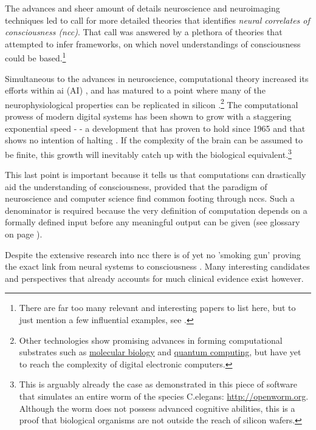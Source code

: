 \documentclass[a4paper,oneside]{memoir}
\begin{document}
The advances and sheer amount of details neuroscience and neuroimaging
techniques led \textcite{atkinson2000} to call for more detailed theories
that identifies \textit{neural correlates of consciousness (\gls{ncc})}.
That call was answered by a plethora of theories
that attempted to infer frameworks, on which novel understandings of
consciousness could be based.\footnote{There are far too many relevant
and interesting papers to list here, but to just mention a few influential examples,
see \cite{baars2005, block2007, crick2003, damasio2003, dehaene2001, graziano2013, kouider2010, Tononi2004, zeki2008, schmidhuber2014, Nilsson2009}.
}

Simultaneous to the advances in neuroscience, \gls{computation}al theory
increased its efforts within \gls{ai} (AI) \autocite{Nilsson2009}, and has
matured to a point where many of the neurophysiological properties can be
replicated in silicon \autocite{Tononi2004, schmidhuber2014, walter2015}.\footnote{Other
technologies show promising advances in forming computational substrates such
as \href{https://en.wikipedia.org/wiki/DNA_computing}{molecular biology}
and \href{https://en.wikipedia.org/wiki/Quantum_computing}{quantum computing},
but have yet to reach the complexity of digital electronic computers.}
The computational prowess of modern digital systems has been shown to grow
with a staggering exponential speed \autocite{Moore1965} - - a development that has proven to
hold since 1965 and that shows no intention of halting
\autocite{Moravec98,kurzweil2001}. If the complexity of the brain can be 
assumed to be finite, this growth will inevitably catch up with the biological
equivalent.\footnote{This is arguably already the case as demonstrated in this
piece of software that simulates an entire worm of the species C.elegans:
\url{http://openworm.org}. Although the worm does not possess advanced cognitive
abilities, this is a proof that biological organisms are not outside the reach
of silicon wafers.}

This last point is important because it tells us that computations can
drastically aid the understanding of consciousness, provided that the
paradigm of neuroscience and computer science find common footing through
\gls{ncc}s. Such a denominator is required because the very definition of
computation depends on a formally defined input before any meaningful output
can be given \autocite{Nilsson2009, schmidhuber2014} (see glossary on
page \pageref{glos}).

Despite the extensive research into \gls{ncc} there is of yet no 'smoking gun'
proving the exact link from neural systems to consciousness
\autocite{sep-consciousness, Hohwy2009, dennett2017}. Many interesting
candidates and perspectives that already accounts for much clinical evidence exist
however.
\end{document}
